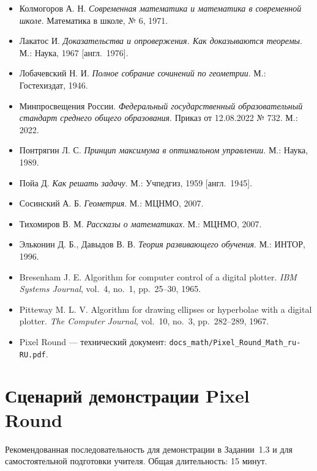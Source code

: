 \documentclass[12pt,a4paper]{scrartcl}
\begin{document}
\begin{itemize}[leftmargin=1.3em,itemsep=0.2em,topsep=0.3em]
  \item Колмогоров А. Н. \emph{Современная математика и математика в современной школе}. Математика в школе, № 6, 1971.
  \item Лакатос И. \emph{Доказательства и опровержения. Как доказываются теоремы}. М.: Наука, 1967 [англ.~1976].
  \item Лобачевский Н. И. \emph{Полное собрание сочинений по геометрии}. М.: Гостехиздат, 1946.
  \item Минпросвещения России. \emph{Федеральный государственный образовательный стандарт среднего общего образования}. Приказ от 12.08.2022 № 732. М.: 2022.
  \item Понтрягин Л. С. \emph{Принцип максимума в оптимальном управлении}. М.: Наука, 1989.
  \item Пойа Д. \emph{Как решать задачу}. М.: Учпедгиз, 1959 [англ.~1945].
  \item Сосинский А. Б. \emph{Геометрия}. М.: МЦНМО, 2007.
  \item Тихомиров В. М. \emph{Рассказы о математиках}. М.: МЦНМО, 2007.
  \item Эльконин Д. Б., Давыдов В. В. \emph{Теория развивающего обучения}. М.: ИНТОР, 1996.
  \item Bresenham J. E. Algorithm for computer control of a digital plotter. \emph{IBM Systems Journal}, vol.~4, no.~1, pp.~25--30, 1965.
  \item Pitteway M. L. V. Algorithm for drawing ellipses or hyperbolae with a digital plotter. \emph{The Computer Journal}, vol.~10, no.~3, pp.~282--289, 1967.
  \item Pixel Round --- технический документ: \texttt{docs\_math/Pixel\_Round\_Math\_ru-RU.pdf}.
\end{itemize}

\newpage
\appendix
\renewcommand{\thesection}{\Alph{section}}
\setcounter{section}{0}

\section{Сценарий демонстрации Pixel Round}\label{ap:scenario}

Рекомендованная последовательность для демонстрации в Задании~1.3 и для самостоятельной подготовки учителя. Общая длительность: 15 минут.
\end{document}
